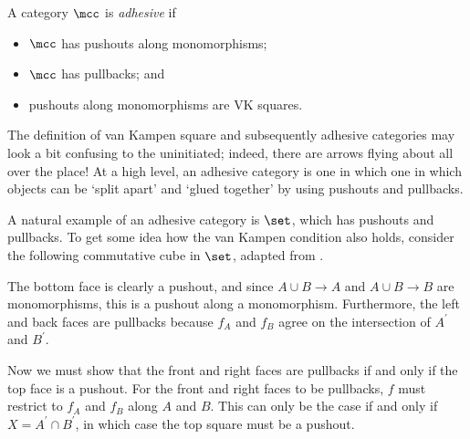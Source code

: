 \begin{definition}
    A category \(\mcc\) is \emph{adhesive} if
    \begin{itemize}
        \item \(\mcc\) has pushouts along monomorphisms;
        \item \(\mcc\) has pullbacks; and
        \item pushouts along monomorphisms are VK squares.
    \end{itemize}
\end{definition}

The definition of van Kampen square and subsequently adhesive categories may
look a bit confusing to the uninitiated; indeed, there are arrows flying about
all over the place!
At a high level, an adhesive category is one in which one in which objects can
be `split apart' and `glued together' by using pushouts and pullbacks.

\begin{example}
    A natural example of an adhesive category is \(\set\), which has pushouts
    and pullbacks.
    To get some idea how the van Kampen condition also holds, consider the
    following commutative cube in \(\set\), adapted from
    \cite[Sec. 4.3]{kissinger2012pictures}.
    \begin{center}
    \end{center}
    The bottom face is clearly a pushout, and since \(A \cup B \to A\) and
    \(A \cup B \to B\) are monomorphisms, this is a pushout along a
    monomorphism.
    Furthermore, the left and back faces are pullbacks because \(f_A\) and
    \(f_B\) agree on the intersection of \(A^\prime\) and \(B^\prime\).

    Now we must show that the front and right faces are pullbacks if and only if
    the top face is a pushout.
    For the front and right faces to be pullbacks, \(f\) must restrict to
    \(f_A\) and \(f_B\) along \(A\) and \(B\).
    This can only be the case if and only if \(X = A^\prime \cap B^\prime\), in
    which case the top square must be a pushout.
\end{example}

